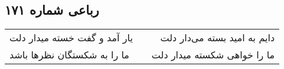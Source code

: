 \begin{center}
\section*{رباعی شماره ۱۷۱}
\label{sec:sh171}
\begin{longtable}{l p{0.5cm} r}
یار آمد و گفت خسته میدار دلت
&&
دایم به امید بسته می‌دار دلت
\\
ما را به شکستگان نظرها باشد
&&
ما را خواهی شکسته میدار دلت
\\
\end{longtable}
\end{center}
